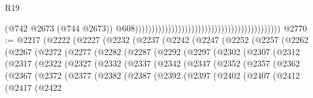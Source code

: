 \begin{lexlean}{R19}
\begin{coremodule}
                                                                                            (@742
                                                                                              @2673
                                                                                              (@744
                                                                                                @2673))
                                                                                            @608))))))))))))))))))))))))))))))))))))))))))))
@2770 := @2217
    (@2222
      (@2227
        (@2232
          (@2237
            (@2242
              (@2247
                (@2252
                  (@2257
                    (@2262
                      (@2267
                        (@2272
                          (@2277
                            (@2282
                              (@2287
                                (@2292
                                  (@2297
                                    (@2302
                                      (@2307
                                        (@2312
                                          (@2317
                                            (@2322
                                              (@2327
                                                (@2332
                                                  (@2337
                                                    (@2342
                                                      (@2347
                                                        (@2352
                                                          (@2357
                                                            (@2362
                                                              (@2367
                                                                (@2372
                                                                  (@2377
                                                                    (@2382
                                                                      (@2387
                                                                        (@2392
                                                                          (@2397
                                                                            (@2402
                                                                              (@2407
                                                                                (@2412
                                                                                  (@2417
                                                                                    (@2422

\end{coremodule}
\end{lexlean}

